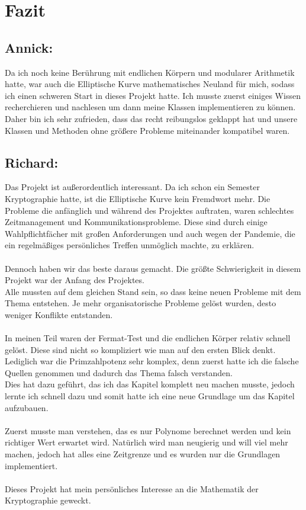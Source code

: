 \chapter{Fazit}

\section*{Annick:}
Da ich noch keine Berührung mit endlichen Körpern und modularer Arithmetik hatte, war auch die Elliptische Kurve mathematisches Neuland für mich, sodass ich einen schweren Start in dieses Projekt hatte. Ich musste zuerst einiges Wissen recherchieren und nachlesen um dann meine Klassen implementieren zu können. Daher bin ich sehr zufrieden, dass das recht reibungslos geklappt hat und unsere Klassen und Methoden ohne größere Probleme miteinander kompatibel waren. 


\section*{Richard:}
Das Projekt ist außerordentlich interessant. Da ich schon ein Semester Kryptographie hatte, 
ist die Elliptische Kurve kein Fremdwort mehr. Die Probleme die anfänglich und während des Projektes auftraten, waren schlechtes Zeitmanagement und Kommunikationsprobleme.
Diese sind durch einige Wahlpflichtfächer mit großen Anforderungen und auch wegen der Pandemie, die ein regelmäßiges persönliches Treffen unmöglich machte, zu erklären.\\
\\
Dennoch haben wir das beste daraus gemacht. Die größte Schwierigkeit in diesem Projekt war der Anfang des Projektes.
\\
Alle mussten auf dem gleichen Stand sein, so dass keine neuen Probleme mit dem Thema entstehen.
Je mehr organisatorische Probleme gelöst wurden, desto weniger Konflikte entstanden.
\\
\\
In meinen Teil waren der Fermat-Test und die endlichen Körper relativ schnell gelöst.
Diese sind nicht so kompliziert wie man auf den ersten Blick denkt.\\
Lediglich war die Primzahlpotenz sehr komplex, denn zuerst hatte ich die falsche Quellen genommen und dadurch das Thema falsch verstanden.\\
Dies hat dazu geführt, das ich das Kapitel komplett neu machen musste, jedoch lernte ich schnell dazu und somit hatte ich eine neue Grundlage um das Kapitel aufzubauen.\\
\\
Zuerst musste man verstehen, das es nur Polynome berechnet werden und kein richtiger Wert erwartet wird. 
Natürlich wird man neugierig und will viel mehr machen, jedoch hat alles eine Zeitgrenze und es wurden nur die Grundlagen implementiert.\\
\\
Dieses Projekt hat mein persönliches Interesse an die Mathematik der Kryptographie geweckt. 

